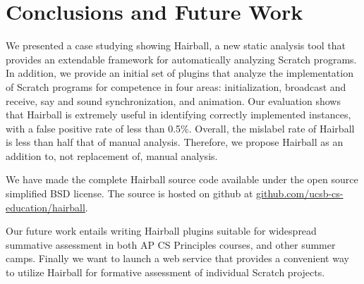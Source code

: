\section{Conclusions and Future Work} 

We presented a case studying showing Hairball, a new static analysis tool that
provides an extendable framework for automatically analyzing Scratch programs.
In addition, we provide an initial set of plugins that analyze the
implementation of Scratch programs for competence in four areas:
initialization, broadcast and receive, say and sound synchronization, and
animation.  Our evaluation shows that Hairball is extremely useful in
identifying correctly implemented instances, with a false positive rate of less
than 0.5\%.  Overall, the mislabel rate of Hairball is less than half that of
manual analysis.  Therefore, we propose Hairball as an addition to, not
replacement of, manual analysis.

We have made the complete Hairball source code available under the open source
simplified BSD license. The source is hosted on github at
\url{github.com/ucsb-cs-education/hairball}.

Our future work entails writing Hairball plugins suitable for wide\-spread
summative assessment in both AP CS Principles courses, and other summer
camps. Finally we want to launch a web service that provides a convenient way
to utilize Hairball for formative assessment of individual Scratch projects.
